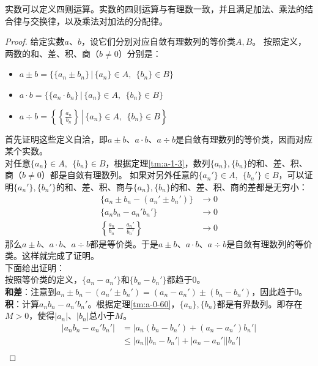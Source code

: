 \documentclass[12pt,UTF8]{ctexbook}
\begin{document}
\begin{appendix}
\begin{tm}\label{tm:a-1-20}
    实数可以定义四则运算。实数的四则运算与有理数一致，并且满足加法、乘法的结合律与交换律，以及乘法对加法的分配律。
\end{tm}
\begin{proof}
    给定实数$a$、$b$，设它们分别对应自敛有理数列的等价类$A,B$。
    按照定义，两数的和、差、积、商（$b\neq 0$）分别是：
    \begin{itemize}
        \item $a \pm b = \{\{a_n \pm b_n\} \, |\, \{a_n\}\in A,\;\,\{b_n\}\in B \}$
        \item $a\cdot b = \{\{a_n \cdot b_n\} \, |\, \{a_n\}\in A,\;\,\{b_n\}\in B \}$
        \item $a\div b = \left.\left\{\left\{\frac{a_n}{b_n}\right\} \, \right|\, \{a_n\}\in A,\;\,\{b_n\}\in B \right\}$
    \end{itemize}
    首先证明这些定义自洽，即$a\pm b$、$a\cdot b$、$a\div b$是自敛有理数列的等价类，因而对应某个实数。\\
    对任意$\{a_n\}\in A,\;\,\{b_n\}\in B$，根据定理\ref{tm:a-1-3}，数列$\{a_n\}, \{b_n\}$的和、差、积、商（$b\neq 0$）都是自敛有理数列。
    如果对另外任意的$\{a_n'\}\in A,\;\,\{b_n'\}\in B$，可以证明$\{a_n'\}, \{b_n'\}$的和、差、积、商与$\{a_n\}, \{b_n\}$的和、差、积、商的差都是无穷小：
    \begin{align*}
        \{a_n \pm b_n - (a_n' \pm b_n')\} &\to 0  \\
        \{a_nb_n - a_n'b_n'\} &\to 0  \\
        \left\{\frac{a_n}{b_n} - \frac{a_n'}{b_n'}\right\} &\to 0  
    \end{align*}
    那么$a\pm b$、$a\cdot b$、$a\div b$都是等价类。于是$a\pm b$、$a\cdot b$、$a\div b$是自敛有理数列的等价类。这样就完成了证明。\\
    下面给出证明：\\
    按照等价类的定义，$\{a_n - a_n'\}$和$\{b_n - b_n'\}$都趋于$0$。\\
    \textbf{和差}：注意到$a_n \pm b_n - (a_n' \pm b_n') = (a_n - a_n') \pm (b_n - b_n')$，因此趋于$0$。\\
    \textbf{积}：计算$a_nb_n - a_n'b_n'$。根据定理\ref{tm:a-0-60}，$\{a_n\}, \{b_n\}$都是有界数列。即存在$M>0$，使得$|a_n|$、$|b_n|$总小于$M$。
    \begin{align*}
        |a_nb_n - a_n'b_n'| &= |a_n(b_n - b_n') + (a_n - a_n')b_n'|  \\
        &\leqslant |a_n||b_n - b_n'| + |a_n - a_n'||b_n'|  \\

\end{align*}
\end{proof}
\end{appendix}
\end{document}
